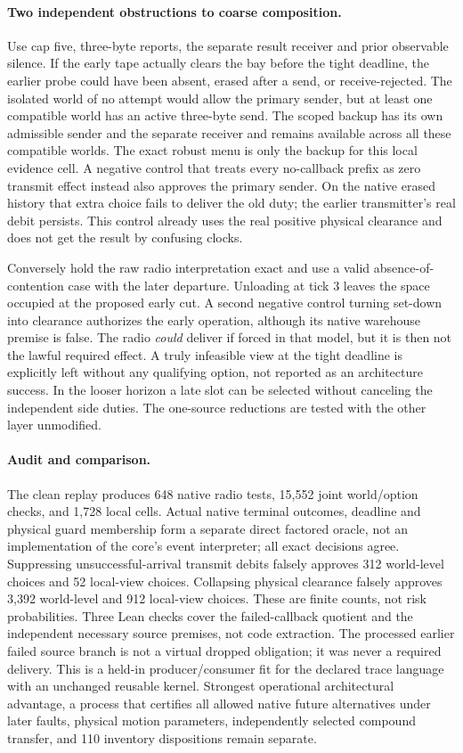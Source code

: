 \documentclass{article}
\begin{document}
\paragraph{Two independent obstructions to coarse composition.}
Use cap five, three-byte reports, the separate result receiver
and prior observable silence. If the early tape actually
clears the bay before the tight deadline, the earlier probe
could have been absent, erased after a send, or receive-rejected.
The isolated world of no attempt would allow the primary
sender, but at least one compatible world has an active
three-byte send. The scoped backup has its own admissible
sender and the separate receiver and remains available across
all these compatible worlds. The exact robust menu is only
the backup for this local evidence cell. A negative control
that treats every no-callback prefix as zero transmit effect
instead also approves the primary sender. On the native
erased history that extra choice fails to deliver the old duty;
the earlier transmitter's real debit persists. This control
already uses the real positive physical clearance and
does not get the result by confusing clocks.

Conversely hold the raw radio interpretation exact and use a
valid absence-of-contention case with the later departure.
Unloading at tick 3 leaves the space occupied at the proposed
early cut. A second negative control turning set-down into
clearance authorizes the early operation, although its native
warehouse premise is false. The radio \emph{could} deliver if
forced in that model, but it is then not the lawful required
effect. A truly infeasible view at the tight deadline is
explicitly left without any qualifying option, not reported as
an architecture success. In the looser horizon a late slot
can be selected without canceling the independent side duties.
The one-source reductions are tested with the other layer
unmodified.

\paragraph{Audit and comparison.}
The clean replay produces 648 native radio tests, 15,552
joint world/option checks, and 1,728 local cells. Actual native
terminal outcomes, deadline and physical guard membership form a
separate direct factored oracle, not an implementation of the
core's event interpreter; all exact decisions agree.
Suppressing unsuccessful-arrival transmit debits falsely approves
312 world-level choices and 52 local-view choices. Collapsing
physical clearance falsely approves 3,392 world-level and 912
local-view choices. These are finite counts, not risk probabilities.
Three Lean checks cover the failed-callback quotient and the
independent necessary source premises, not code extraction.
The processed earlier failed source branch is not a virtual
dropped obligation; it was never a required delivery.
This is a held-in producer/consumer fit for the declared trace
language with an unchanged reusable kernel. Strongest operational
architectural advantage, a process that certifies all allowed native
future alternatives under later faults, physical motion parameters,
independently selected compound transfer, and 110 inventory
dispositions remain separate.
\end{document}
